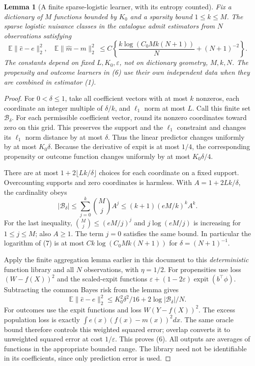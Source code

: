 \documentclass[11pt]{article}
\newtheorem{lemma}[theorem]{Lemma}
\theoremstyle{definition}
\begin{document}
\begin{lemma}[A finite sparse-logistic learner, with its entropy counted]
Fix a dictionary of $M$ functions bounded by $K_0$ and a sparsity bound
$1\le k\le M$. The sparse logistic nuisance classes in the catalogue
admit estimators from $N$ observations satisfying
\[
 \mathbb E\|\widehat e-e\|_2^2,
 \quad\mathbb E\|\widehat m-m\|_2^2
 \ \le C\left\{\frac{k\log(C_0 M k(N+1))}{N}
                          +(N+1)^{-2}\right\}.       \tag{6}
\]
The constants depend on fixed $L,K_0,\varepsilon$, not on dictionary
geometry, $M,k,N$. The propensity and outcome learners in (6) use their
own independent data when they are combined in estimator (1).
\end{lemma}
\begin{proof}
For $0<\delta\le1$, take all coefficient vectors with at most $k$
nonzeros, each coordinate an integer multiple of $\delta/k$, and
$\ell_1$ norm at most $L$. Call this finite set $\mathcal B_\delta$.
For each permissible coefficient vector, round its nonzero coordinates
toward zero on this grid. This preserves the support and the $\ell_1$
constraint and changes its $\ell_1$ norm distance by at most $\delta$.
Thus the linear predictor changes uniformly by at most $K_0\delta$.
Because the derivative of expit is at most $1/4$, the corresponding
propensity or outcome function changes uniformly by at most
$K_0\delta/4$.

There are at most $1+2\lfloor Lk/\delta\rfloor$ choices for each
coordinate on a fixed support. Overcounting supports and zero coordinates
is harmless. With $A=1+2Lk/\delta$, the cardinality obeys
\[
 |\mathcal B_\delta|
 \le\sum_{j=0}^k\binom Mj A^j
 \le (k+1)(eM/k)^k A^k.                              \tag{7}
\]
For the last inequality, $\binom Mj\le(eM/j)^j$ and
$j\log(eM/j)$ is increasing for $1\le j\le M$; also $A\ge1$.
The term $j=0$ satisfies the same bound. In particular the logarithm of
(7) is at most $C k\log(C_0 M k(N+1))$ for
$\delta=(N+1)^{-1}$.

Apply the finite aggregation lemma earlier in this document to this
\emph{deterministic} function library and all $N$ observations, with
$\eta=1/2$. For propensities use loss $(W-f(X))^2$ and the scaled-expit
functions $\varepsilon+(1-2\varepsilon)\operatorname{expit}(b^\top\phi)$.
Subtracting the common Bayes risk from the lemma gives
\[
 \mathbb E\|\widehat e-e\|_2^2
 \le K_0^2\delta^2/16+2\log|\mathcal B_\delta|/N.
\]
For outcomes use the expit functions and loss $W(Y-f(X))^2$.
The excess population loss is exactly
$\int e(x)(f(x)-m(x))^2dx$. The same oracle bound therefore controls
this weighted squared error; overlap converts it to unweighted squared
error at cost $1/\varepsilon$. This proves (6). All outputs are averages
of functions in the appropriate bounded range. The library need not be
identifiable in its coefficients, since only prediction error is used.
\end{proof}
\end{document}
